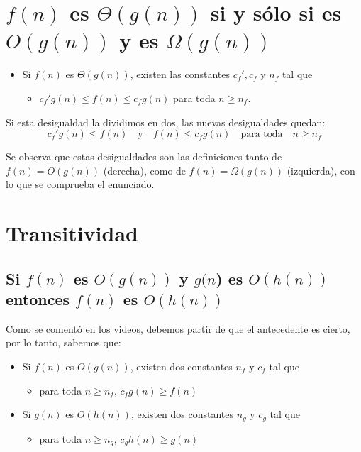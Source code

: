 \documentclass[letterpaper, 12pt]{article}
\begin{document}
\section{\(f(n)\) es \(\Theta(g(n))\) si y sólo si es \(O(g(n))\) y es \(\Omega(g(n))\)}
\label{sec:org5cd6a49}
\begin{itemize}
\item Si \(f(n)\) es \(\Theta(g(n))\), existen las constantes \(c_f', c_f\) y \(n_f\) tal
que
\begin{itemize}
\item \(c_f' g(n) \leq f(n) \leq c_f g(n)\) para toda \(n \geq n_f\).
\end{itemize}
\end{itemize}

\noindent
Si esta desigualdad la dividimos en dos, las nuevas desigualdades quedan:
$$
c_f' g(n) \leq f(n) \quad \mbox{y} \quad f(n) \leq c_f g(n)
    \quad \mbox{para toda} \quad n \geq n_f
$$

\noindent
Se observa que estas desigualdades son las definiciones tanto de
\(f(n) = O(g(n))\) (derecha), como de \(f(n) = \Omega(g(n))\) (izquierda), con lo
que se comprueba el enunciado.
\section{Transitividad}
\label{sec:org3ddb54e}
\subsection{Si \(f(n)\) es \(O(g(n))\) y \(g(n\)) es \(O(h(n))\) entonces \(f(n)\) es \(O(h(n))\)}
\label{sec:org350b076}
Como se comentó en los videos, debemos partir de que el antecedente es cierto,
por lo tanto, sabemos que:
\begin{itemize}
\item Si \(f(n)\) es \(O(g(n))\), existen dos constantes \(n_f\) y \(c_f\) tal que
\begin{itemize}
\item para toda \(n \geq n_f\), \(c_f g(n) \geq f(n)\)
\end{itemize}
\item Si \(g(n)\) es \(O(h(n))\), existen dos constantes \(n_g\) y \(c_g\) tal que
\begin{itemize}
\item para toda \(n \geq n_g\), \(c_g h(n) \geq g(n)\)
\end{itemize}
\end{itemize}
\end{document}
